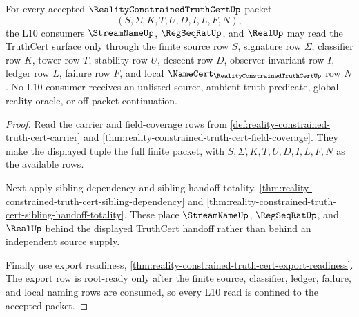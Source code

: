 \begin{theorem}
\label{thm:reality-constrained-truth-cert-l10-source-readiness}
For every accepted $\RealityConstrainedTruthCertUp$ packet
$$
(S,\Sigma,K,T,U,D,I,L,F,N),
$$
the L10 consumers $\StreamNameUp$, $\RegSeqRatUp$, and $\RealUp$ may read the
TruthCert surface only through the finite source row $S$, signature row
$\Sigma$, classifier row $K$, tower row $T$, stability row $U$, descent row
$D$, observer-invariant row $I$, ledger row $L$, failure row $F$, and local
$\NameCert_{\RealityConstrainedTruthCertUp}$ row $N$. No L10 consumer receives
an unlisted source, ambient truth predicate, global reality oracle, or
off-packet continuation.
\end{theorem}
\begin{proof}
Read the carrier and field-coverage rows from
\autoref{def:reality-constrained-truth-cert-carrier} and
\autoref{thm:reality-constrained-truth-cert-field-coverage}. They make the
displayed tuple the full finite packet, with $S,\Sigma,K,T,U,D,I,L,F,N$ as the
available rows.

Next apply sibling dependency and sibling handoff totality,
\autoref{thm:reality-constrained-truth-cert-sibling-dependency} and
\autoref{thm:reality-constrained-truth-cert-sibling-handoff-totality}. These
place $\StreamNameUp$, $\RegSeqRatUp$, and $\RealUp$ behind the displayed
TruthCert handoff rather than behind an independent source supply.

Finally use export readiness,
\autoref{thm:reality-constrained-truth-cert-export-readiness}. The export row
is root-ready only after the finite source, classifier, ledger, failure, and
local naming rows are consumed, so every L10 read is confined to the accepted
packet.
\end{proof}

